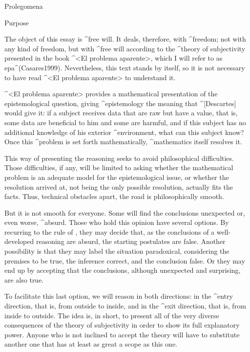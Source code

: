 
\Part Prolegomena

\Section Purpose

The object of this essay is ^{free will}. It deals, therefore, with
^{freedom}; not with any kind of freedom, but with ^{free will}
according to the ^{theory of subjectivity} presented in the book  ^<El
problema aparente>, which I will refer to as {\sc epa}^(Casares1999).
Nevertheless, this text stands by itself, so it is not necessary to have
read ^<El problema aparente> to understand it.

^<El problema aparente> provides a mathematical presentation of the
epistemological question, giving ^{epistemology} the meaning that
^[Descartes] would give it: if a subject receives data that are raw but
have a value, that is, some data are beneficial to him and some are
harmful, and if this subject has no additional 
knowledge of his exterior ^{environment}, what can this subject know?
Once this ^{problem} is set forth mathematically, ^{mathematics} itself
resolves it.

This way of presenting the reasoning seeks to avoid philosophical
difficulties. Those difficulties, if any, will be limited to asking
whether the mathematical problem is an adequate model for the
epistemological issue, or whether the resolution arrived at, not being
the only possible resolution, actually fits the facts. Thus, technical
obstacles apart, the road is philosophically smooth.

But it is not smooth for everyone. Some will find the conclusions
unexpected or, even worse, ^{absurd}. Those who hold this opinion have
several options. By recurring to the rule of , they may decide that, as the conclusions of a well-developed
reasoning are absurd, the starting postulates are false. Another
possibility is that they may label the situation paradoxical,
considering the premises to be true, the inference correct, and the
conclusion false. Or they may end up by accepting that the conclusions,
although unexpected and surprising, are also true.

To facilitate this last option, we will reason in both directions: in
the ^{entry} direction, that is, from outside to inside, and in the
^{exit} direction, that is, from inside to outside. The idea is, in
short, to present all of the very diverse consequences of the theory of
subjectivity in order to show its full explanatory power. Anyone who is
not inclined to accept the theory will have to substitute another one
that has at least as great a scope as this one.


